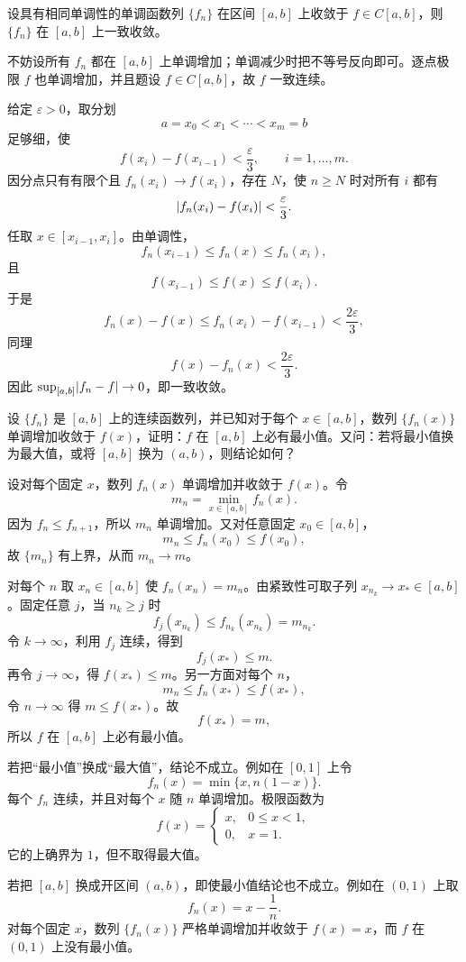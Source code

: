 \begin{xreferenceproblem}[3]
设具有相同单调性的单调函数列 $\{f_n\}$ 在区间 $[a,b]$ 上收敛于 $f\in C[a,b]$，则 $\{f_n\}$ 在 $[a,b]$ 上一致收敛。
\end{xreferenceproblem}
\begin{xsolution}
不妨设所有 $f_n$ 都在 $[a,b]$ 上单调增加；单调减少时把不等号反向即可。逐点极限 $f$ 也单调增加，并且题设 $f\in C[a,b]$，故 $f$ 一致连续。

给定 $\varepsilon>0$，取分划
\[
  a=x_0<x_1<\cdots<x_m=b
\]
足够细，使
\[
  f(x_i)-f(x_{i-1})<\frac\varepsilon3,
  \qquad i=1,\ldots,m.
\]
因分点只有有限个且 $f_n(x_i)\to f(x_i)$，存在 $N$，使 $n\geqslant N$ 时对所有 $i$ 都有
\[
  \lvert f_n(x_i)-f(x_i)\rvert<\frac\varepsilon3.
\]
任取 $x\in[x_{i-1},x_i]$。由单调性，
\[
  f_n(x_{i-1})\leqslant f_n(x)\leqslant f_n(x_i),
\]
且
\[
  f(x_{i-1})\leqslant f(x)\leqslant f(x_i).
\]
于是
\[
  f_n(x)-f(x)
  \leqslant f_n(x_i)-f(x_{i-1})
  <\frac{2\varepsilon}{3},
\]
同理
\[
  f(x)-f_n(x)<\frac{2\varepsilon}{3}.
\]
因此 $\sup_{[a,b]}\lvert f_n-f\rvert\to0$，即一致收敛。
\end{xsolution}


\begin{xreferenceproblem}[4]
设 $\{f_n\}$ 是 $[a,b]$ 上的连续函数列，并已知对于每个 $x\in[a,b]$，数列 $\{f_n(x)\}$ 单调增加收敛于 $f(x)$，证明：$f$ 在 $[a,b]$ 上必有最小值。又问：若将最小值换为最大值，或将 $[a,b]$ 换为 $(a,b)$，则结论如何？
\end{xreferenceproblem}
\begin{xsolution}
设对每个固定 $x$，数列 $f_n(x)$ 单调增加并收敛于 $f(x)$。令
\[
  m_n=\min_{x\in[a,b]}f_n(x).
\]
因为 $f_n\leqslant f_{n+1}$，所以 $m_n$ 单调增加。又对任意固定 $x_0\in[a,b]$，
\[
  m_n\leqslant f_n(x_0)\leqslant f(x_0),
\]
故 $\{m_n\}$ 有上界，从而 $m_n\to m$。

对每个 $n$ 取 $x_n\in[a,b]$ 使 $f_n(x_n)=m_n$。由紧致性可取子列 $x_{n_k}\to x_*\in[a,b]$。固定任意 $j$，当 $n_k\geqslant j$ 时
\[
  f_j(x_{n_k})\leqslant f_{n_k}(x_{n_k})=m_{n_k}.
\]
令 $k\to\infty$，利用 $f_j$ 连续，得到
\[
  f_j(x_*)\leqslant m.
\]
再令 $j\to\infty$，得 $f(x_*)\leqslant m$。另一方面对每个 $n$，
\[
  m_n\leqslant f_n(x_*)\leqslant f(x_*),
\]
令 $n\to\infty$ 得 $m\leqslant f(x_*)$。故
\[
  f(x_*)=m,
\]
所以 $f$ 在 $[a,b]$ 上必有最小值。

若把“最小值”换成“最大值”，结论不成立。例如在 $[0,1]$ 上令
\[
  f_n(x)=\min\{x,n(1-x)\}.
\]
每个 $f_n$ 连续，并且对每个 $x$ 随 $n$ 单调增加。极限函数为
\[
  f(x)=
  \begin{cases}
    x,&0\leqslant x<1,\\
    0,&x=1.
  \end{cases}
\]
它的上确界为 $1$，但不取得最大值。

若把 $[a,b]$ 换成开区间 $(a,b)$，即使最小值结论也不成立。例如在 $(0,1)$ 上取
\[
  f_n(x)=x-\frac1n.
\]
对每个固定 $x$，数列 $\{f_n(x)\}$ 严格单调增加并收敛于 $f(x)=x$，而 $f$ 在 $(0,1)$ 上没有最小值。
\end{xsolution}


